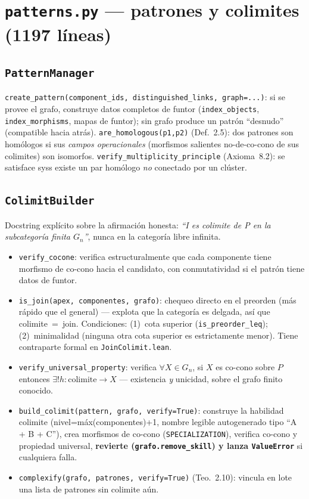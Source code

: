 \documentclass[11pt,a4paper]{report}
\newcommand{\code}[1]{\texttt{#1}}
\begin{document}
\section{\code{patterns.py} --- patrones y colimites (1197 l\'ineas)}

\subsection{\code{PatternManager}}
\code{create_pattern(component_ids, distinguished_links, graph=...)}: si se provee el grafo, construye datos completos de funtor (\code{index_objects}, \code{index_morphisms}, mapas de funtor); sin grafo produce un patr\'on ``desnudo'' (compatible hacia atr\'as). \code{are_homologous(p1,p2)} (Def.~2.5): dos patrones son hom\'ologos si sus \emph{campos operacionales} (morfismos salientes no-de-co-cono de sus colimites) son isomorfos. \code{verify_multiplicity_principle} (Axioma~8.2): se satisface syss existe un par hom\'ologo \emph{no} conectado por un cl\'uster.

\subsection{\code{ColimitBuilder}}
Docstring expl\'icito sobre la afirmaci\'on honesta: \emph{``I es colimite de P en la subcategor\'ia finita $G_n$''}, nunca en la categor\'ia libre infinita.
\begin{itemize}
  \item \code{verify_cocone}: verifica estructuralmente que cada componente tiene morfismo de co-cono hacia el candidato, con conmutatividad si el patr\'on tiene datos de funtor.
  \item \code{is_join(apex, componentes, grafo)}: chequeo directo en el preorden (m\'as r\'apido que el general) --- explota que la categor\'ia es delgada, as\'i que colimite~=~join. Condiciones: (1)~cota superior (\code{is_preorder_leq}); (2)~minimalidad (ninguna otra cota superior es estrictamente menor). Tiene contraparte formal en \code{JoinColimit.lean}.
  \item \code{verify_universal_property}: verifica $\forall X\in G_n$, si $X$ es co-cono sobre $P$ entonces $\exists! h:\text{colimite}\to X$ --- existencia \emph{y} unicidad, sobre el grafo finito conocido.
  \item \code{build_colimit(pattern, grafo, verify=True)}: construye la habilidad colimite (nivel=m\'ax(componentes)+1, nombre legible autogenerado tipo ``A + B + C''), crea morfismos de co-cono (\code{SPECIALIZATION}), verifica co-cono y propiedad universal, \textbf{revierte (\code{grafo.remove\_skill}) y lanza \code{ValueError}} si cualquiera falla.
  \item \code{complexify(grafo, patrones, verify=True)} (Teo.~2.10): vincula en lote una lista de patrones sin colimite a\'un.
\end{itemize}
\end{document}
